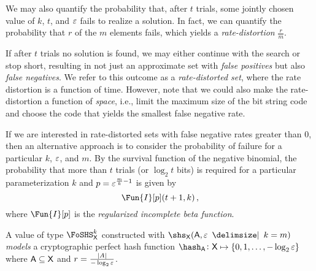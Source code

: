\documentclass[ ../main.tex]{subfiles}
\begin{document}
We may also quantify the probability that, after $t$ trials, some jointly chosen value of $k$, $t$, and $\varepsilon$ fails to realize a solution.
In fact, we can quantify the probability that $r$ of the $m$ elements fails, which yields a \emph{rate-distortion} $\frac{r}{m}$.

If after $t$ trials no solution is found, we may either continue with the search or stop short, resulting in not just an approximate set with \emph{false positives} but also \emph{false negatives}.
We refer to this outcome as a \emph{rate-distorted set}, where the rate distortion is a function of time.
However, note that we could also make the rate-distortion a function of \emph{space}, i.e., limit the maximum size of the bit string code and choose the code that yields the smallest false negative rate.


If we are interested in rate-distorted sets with false negative rates greater than $0$, then an alternative approach is to consider the probability of failure for a particular $k$, $\varepsilon$, and $m$.
By the survival function of the negative binomial, the probability that more than $t$ trials (or $\log_2 t$ bits) is required for a particular parameterization $k$ and $p = \varepsilon^{\frac{m}{k}-1}$ is given by
\begin{equation}
	\Fun{I}[p](t+1, k)\,,
\end{equation}
where $\Fun{I}[p]$ is the \emph{regularized incomplete beta function}.





\begin{theorem}
	A value of type $\FoSHS_{\Set{X}}^{k}$ constructed with $\shs_{\Set{X}}(\Set{A},\fprate \; \Given \; k = m)$ \emph{models} a cryptographic perfect hash function $\hash_{\Set{A}} \colon \Set{X} \mapsto \{0,1,\ldots,-\log_2 \fprate\}$ where $\Set{A} \subseteq \Set{X}$ and $r = \frac{\lvert A\rvert}{-\log_2 \varepsilon}$.
\end{theorem}
\end{document}
